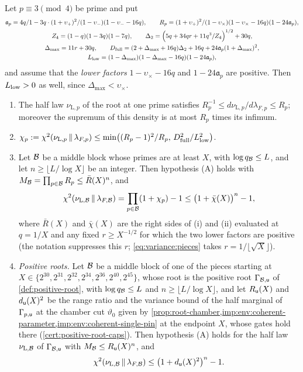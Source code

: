 \begin{lemma}\label{lem:record:root-marginal}
Let $p\equiv3\pmod4$ be prime and put
\begin{gather*}
 \mathfrak a_p=\frac{4q}{1-3q}\cdot\frac{(1+\upsilon_+)^2}
 {(1-\upsilon_-)(1-\upsilon_--16q)},\qquad
 R_p=\frac{(1+\upsilon_+)^2}{(1-\upsilon_\times)(1-\upsilon_\times-16q)
 (1-24\mathfrak a_p)},\\
 Z_4=(1-q)(1-3q)(1-7q),\qquad
 \Delta_2=\Bigl(\frac{5q+34qr+11q^3}{Z_4}\Bigr)^{1/2}+30q,\\
 \Delta_{\max}=11r+30q,\qquad
 D_{\rm full}=(2+\Delta_{\max}+16q)\Delta_2+16q+24\mathfrak a_p(1+\Delta_{\max})^2,\\
 L_{\rm low}=(1-\Delta_{\max})(1-\Delta_{\max}-16q)(1-24\mathfrak a_p),
\end{gather*}
and assume that the \emph{lower factors} $1-\upsilon_\times-16q$ and
$1-24\mathfrak a_p$ are positive. Then $L_{\rm low}>0$ as well, since
$\Delta_{\max}<\upsilon_\times$.
\begin{enumerate}[label=(\roman*)]
\item The half law $\nu_{\mathrm L,p}$ of the root at one prime satisfies
 $R_p^{-1}\le d\nu_{\mathrm L,p}/d\lambda_{F,p}\le R_p$; moreover the
 supremum of this density is at most $R_p$ times its infimum.
\item $\chi_p:=\chi^2(\nu_{\mathrm L,p}\,\|\,\lambda_{F,p})\le
 \min\bigl((R_p-1)^2/R_p,\,D_{\rm full}^2/L_{\rm low}^2\bigr)$.
\item Let $\Blk$ be a middle block whose primes are at least $X$, with
 $\log q_\Blk\le L$, and let $n\ge\lfloor L/\log X\rfloor$ be an integer.
 Then hypothesis (A) holds with $M_\Blk=\prod_{p\in\Blk}R_p\le\bar R(X)^n$,
 and
 \[
  \chi^2(\nu_{\mathrm L,\Blk}\,\|\,\lambda_{F,\Blk})=\prod_{p\in\Blk}(1+\chi_p)-1
  \le\bigl(1+\bar\chi(X)\bigr)^n-1,
 \]
 where $\bar R(X)$ and $\bar\chi(X)$ are the right sides of (i) and (ii)
 evaluated at $q=1/X$ and any fixed $r\ge X^{-1/2}$ for which the two lower
 factors are positive (the notation suppresses this $r$;
 \eqref{eq:variance:pieces} takes $r=1/\lfloor\sqrt X\rfloor$).
\item \emph{Positive roots.} Let $\Blk$ be a middle block of one of the pieces
 starting at $X\in\{2^{30},2^{31},2^{32},2^{34},2^{36},2^{40},2^{45}\}$, whose root is the positive root
 $\Gamma_{\Blk,\ulaw}$ of \cref{def:positive-root}, with $\log q_\Blk\le L$ and
 $n\ge\lfloor L/\log X\rfloor$, and let $R_\ulaw(X)$ and $d_\ulaw(X)^2$ be the
 range ratio and the variance bound of the half marginal of $\Gamma_{p,\ulaw}$ at
 the chamber cut $\vartheta_0$ given by
\cref{prop:root-chamber,imp:env:coherent-parameter,imp:env:coherent-single-pin} at the endpoint
 $X$, whose gates hold there (\cref{cert:positive-root-caps}). Then hypothesis
 (A) holds for the half law $\nu_{\mathrm L,\Blk}$ of $\Gamma_{\Blk,\ulaw}$ with
 $M_\Blk\le R_\ulaw(X)^n$, and
 \[
  \chi^2(\nu_{\mathrm L,\Blk}\,\|\,\lambda_{F,\Blk})\le
  \bigl(1+d_\ulaw(X)^2\bigr)^n-1 .
 \]
\end{enumerate}
\end{lemma}

